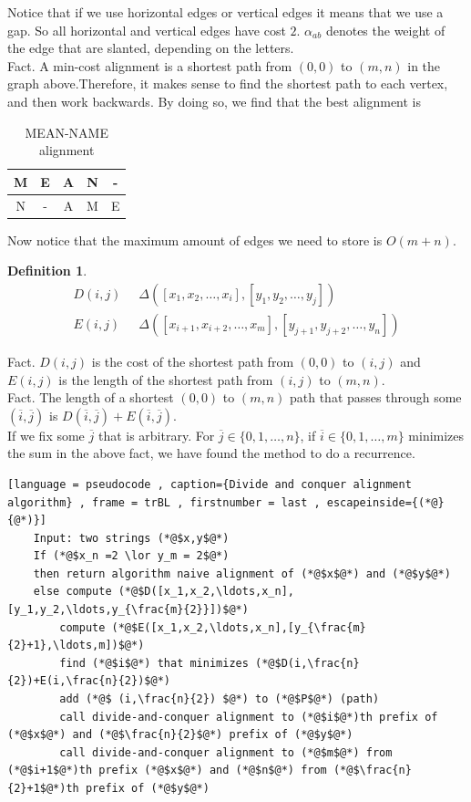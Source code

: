 \documentclass[a4paper]{article}
\theoremstyle{plain}
\newcommand*{\MyDef}{\mathrm{def}}
\newcommand*{\eqdef}{\ensuremath{\mathop{\overset{\MyDef}{=}}}}
\theoremstyle{definition}
\newtheorem{defn}{Definition}[section]
\theoremstyle{remark}
\begin{document}
	Notice that if we use horizontal edges or vertical edges it means that we use a gap. So all horizontal and vertical edges have cost $2$. $\alpha_{ab}$ denotes the weight of the edge that are slanted, depending on the letters. \\
	Fact. A min-cost alignment is a shortest path from $(0,0)$ to $(m,n)$ in the graph above.Therefore, it makes sense to find the shortest path to each vertex, and then work backwards. By doing so, we find that the best alignment is
	\begin{table}[H]
		\centering
		\caption{MEAN-NAME alignment}
		\label{tab:meanname}
		\begin{tabular}{|c|c|c|c|c|}
			\hline
		M & E & A & N & -  \\
		\hline
		N & - & A & M & E \\
		\hline
		\end{tabular}
	\end{table}
	Now notice that the maximum amount of edges we need to store is $O(m+n)$. 
	\begin{defn}
		\begin{align*}
			D(i,j) &\eqdef \Delta([x_1,x_2,\ldots,x_i],[y_1,y_2,\ldots,y_j]) \\
			E(i,j) &\eqdef \Delta([x_{i+1},x_{i+2},\ldots,x_{m}],[y_{j+1},y_{j+2},\ldots,y_{n}])
		\end{align*}
	\end{defn}
	Fact. $D(i,j)$ is the cost of the shortest path from $(0,0)$ to $(i,j)$ and $E(i,j)$ is the length of the shortest path from $(i,j)$ to $(m,n)$.\\
	Fact. The length of a shortest $(0,0)$ to $(m,n)$ path that passes through some $(\overline{i},\overline{j})$ is $D(\overline{i},\overline{j}) + E(\overline{i},\overline{j})$. \\
	If we fix some $\overline{j}$ that is arbitrary. For $\overline{j} \in \{0,1,\ldots,n\}$, if $\overline{i} \in \{0,1,\ldots,m\}$ minimizes the sum in the above fact, we have found the method to do a recurrence.
	\begin{lstlisting}[language = pseudocode , caption={Divide and conquer alignment algorithm} , frame = trBL , firstnumber = last , escapeinside={(*@}{@*)}]
	Input: two strings (*@$x,y$@*)
	If (*@$x_n =2 \lor y_m = 2$@*)
	then return algorithm naive alignment of (*@$x$@*) and (*@$y$@*)
	else compute (*@$D([x_1,x_2,\ldots,x_n],[y_1,y_2,\ldots,y_{\frac{m}{2}}])$@*)
		compute (*@$E([x_1,x_2,\ldots,x_n],[y_{\frac{m}{2}+1},\ldots,m])$@*)
		find (*@$i$@*) that minimizes (*@$D(i,\frac{n}{2})+E(i,\frac{n}{2})$@*)
		add (*@$ (i,\frac{n}{2}) $@*) to (*@$P$@*) (path)
		call divide-and-conquer alignment to (*@$i$@*)th prefix of (*@$x$@*) and (*@$\frac{n}{2}$@*) prefix of (*@$y$@*)
		call divide-and-conquer alignment to (*@$m$@*) from (*@$i+1$@*)th prefix (*@$x$@*) and (*@$n$@*) from (*@$\frac{n}{2}+1$@*)th prefix of (*@$y$@*)
	\end{lstlisting}
\end{document}
